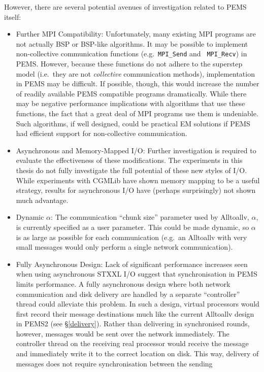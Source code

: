 \documentclass[12pt]{carletoncsthesis}
\begin{document}
However, there are several potential avenues of investigation related to
PEMS itself:
\begin{itemize}
\item Further MPI Compatibility: Unfortunately, many existing MPI programs are
not actually BSP or BSP-like algorithms.  It may be possible to implement
non-collective communication functions (e.g.\ {\tt MPI\_Send} and {\tt
MPI\_Recv}) in PEMS.  However, because these functions do not adhere to the
superstep model (i.e.\ they are not {\em collective} communication methods),
implementation in PEMS may be difficult.  If possible, though, this would
increase the number of readily available PEMS compatible programs dramatically.
While there may be negative performance implications with algorithms that
use these functions, the fact that a great deal of MPI programs use them
is undeniable.  Such algorithms, if well designed, could be practical EM
solutions if PEMS had efficient support for non-collective communication.
\item Asynchronous and Memory-Mapped I/O: Further investigation is required to
evaluate the effectiveness of these modifications.  The experiments in this
thesis do not fully investigate the full potential of these new styles of I/O.
While experiments with CGMLib have shown memory mapping to be a useful strategy,
results for asynchronous I/O have (perhaps surprisingly) not shown much advantage.
\item Dynamic $\alpha$: The communication ``chunk size'' parameter used by
Alltoallv, $\alpha$, is currently specified as a user parameter.  This could be
made dynamic, so $\alpha$ is as large as possible for each communication (e.g.\
an Alltoallv with very small messages would only perform a single network communication).
\item Fully Asynchronous Design: Lack of significant performance increases seen
when using asynchronous STXXL I/O suggest that synchronisation in PEMS limits
performance.  A fully asynchronous design where both network communication
and disk delivery are handled by a separate ``controller'' thread could
alleviate this problem.  In such a design, virtual processors would first
record their message destinations much like the current Alltoallv design
in PEMS2 (see \S\ref{delivery}).  Rather than delivering in synchronised
rounds, however, messages would be sent over the network immediately.
The controller thread on the receiving real processor would receive the
message and immediately write it to the correct location on disk.  This way,
delivery of messages does not require synchronisation between the sending

\end{itemize}
\end{document}
